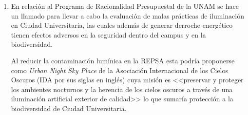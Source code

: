 \begin{enumerate}[I]
\item En relación al Programa de Racionalidad Presupuestal de la UNAM se hace un llamado para llevar a cabo la evaluación de malas prácticas de iluminación en Ciudad Universitaria, las cuales además de generar derroche energético tienen efectos adversos en la seguridad dentro del campus y en la biodiversidad.

Al reducir la contaminación lumínica en la REPSA esta podría proponerse como \textit{Urban Night Sky Place} de la Asociación Internacional de los Cielos Oscuros (IDA por sus siglas en inglés) cuya misión es <<preservar y proteger los ambientes nocturnos y la herencia de los cielos oscuros a través de una iluminación artificial exterior de calidad>> lo que sumaría protección a la biodiversidad de Ciudad Universitaria. 

\end{enumerate}